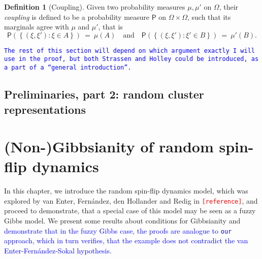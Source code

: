 \documentclass[12pt]{article}
\newcommand{\PP}{\mathsf{P}}
\newcommand{\set}[1]{\left\{#1\right\}}
\newcommand{\1}{\mathbbm{1}}
\newcommand{\5}{\vspace{0.5cm}}
\theoremstyle{definition}
\newtheorem{df}[thm]{Definition}
\begin{document}
\begin{df}[Coupling]
Given two probability measures $\mu,\mu'$ on $\Omega$, their \textit{coupling} is defined to be a probability measure $\PP$ on $\Omega\times\Omega$, such that its marginals agree with $\mu$ and $\mu'$, that is
$$\PP(\set{(\xi,\xi'):\xi\in A}) ~=~ \mu(A) \quad \text{and} \quad \PP(\set{(\xi,\xi'):\xi'\in B}) ~=~ \mu'(B).$$
\end{df}

\textcolor{blue}{\texttt{The rest of this section will depend on which argument exactly I will use in the proof, but both Strassen and Holley could be introduced, as a part of a ``general introduction''.}}


\subsection{Preliminaries, part 2: random cluster representations}


\pagebreak


\section{(Non-)Gibbsianity of random spin-flip dynamics}

In this chapter, we introduce the random spin-flip dynamics model, which was explored by van Enter, Fern\'andez, den Hollander and Redig in \textcolor{red}{\texttt{[reference]}}, and proceed to demonstrate, that a special case of this model may be seen as a fuzzy Gibbs model. We present some results about conditions for Gibbsianity and \textcolor{blue}{demonstrate that in the fuzzy Gibbs case, the proofs are analogue to \texttt{our} approach, which in turn verifies, that the example does not contradict the van Enter-Fern\'andez-Sokal hypothesis}.

\end{document}
